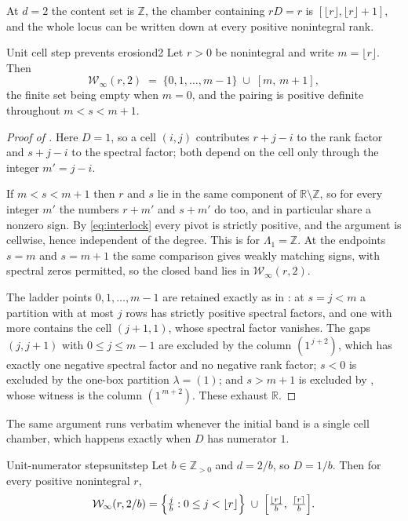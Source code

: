 \documentclass[11pt,letterpaper]{article}
\newcommand{\Zint}{\mathbb{Z}}
\newcommand{\Rr}{\mathbb{R}}
\begin{document}
At $d=2$ the content set is $\Zint$, the chamber containing $rD=r$ is
$[\lfloor r\rfloor,\lfloor r\rfloor+1]$, and the whole locus can be written down
at every positive nonintegral rank.

\begin{theorem}{Unit cell step prevents erosion}{d2}
Let $r>0$ be nonintegral and write $m=\lfloor r\rfloor$. Then
\begin{equation}
  \mathcal{W}_\infty(r,2)
  \;=\;\{0,1,\dots,m-1\}\;\cup\;[m,\,m+1],
  \label{eq:d2locus}
\end{equation}
the finite set being empty when $m=0$, and the pairing is positive definite
throughout $m<s<m+1$.
\end{theorem}

\begin{proof}[Proof of ]
Here $D=1$, so a cell $(i,j)$ contributes $r+j-i$ to the rank factor and $s+j-i$
to the spectral factor; both depend on the cell only through the integer $m'=j-i$.

If $m<s<m+1$ then $r$ and $s$ lie in the same component of $\Rr\setminus\Zint$,
so for every integer $m'$ the numbers $r+m'$ and $s+m'$ do too, and in particular
share a nonzero sign. By \eqref{eq:interlock} every pivot is strictly positive,
and the argument is cellwise, hence independent of the degree. This is
 for $\Lambda_1=\Zint$. At the endpoints $s=m$ and $s=m+1$ the
same comparison gives weakly matching signs, with spectral zeros permitted, so
the closed band lies in $\mathcal{W}_\infty(r,2)$.

The ladder points $0,1,\dots,m-1$ are retained exactly as in
: at $s=j<m$ a partition with at most $j$ rows has strictly
positive spectral factors, and one with more contains the cell $(j+1,1)$, whose
spectral factor vanishes. The gaps $(j,j+1)$ with $0\le j\le m-1$ are excluded by
the column $(1^{\,j+2})$, which has exactly one negative spectral factor and no
negative rank factor; $s<0$ is excluded by the one-box partition $\lambda=(1)$; and $s>m+1$ is excluded by
, whose witness is the column $(1^{\,m+2})$. These exhaust $\Rr$.
\end{proof}

The same argument runs verbatim whenever the initial band is a single cell
chamber, which happens exactly when $D$ has numerator $1$.

\begin{boxedcorollary}{Unit-numerator steps}{unitstep}
Let $b\in\Zint_{>0}$ and $d=2/b$, so $D=1/b$. Then for every positive nonintegral
$r$,
\begin{equation}
  \mathcal{W}_\infty(r,2/b)
  =\Bigl\{\tfrac jb:0\le j<\lfloor r\rfloor\Bigr\}
  \;\cup\;\Bigl[\tfrac{\lfloor r\rfloor}{b},\;\tfrac{\lceil r\rceil}{b}\Bigr].
  \label{eq:unitstep}
\end{equation}
\end{boxedcorollary}
\end{document}
